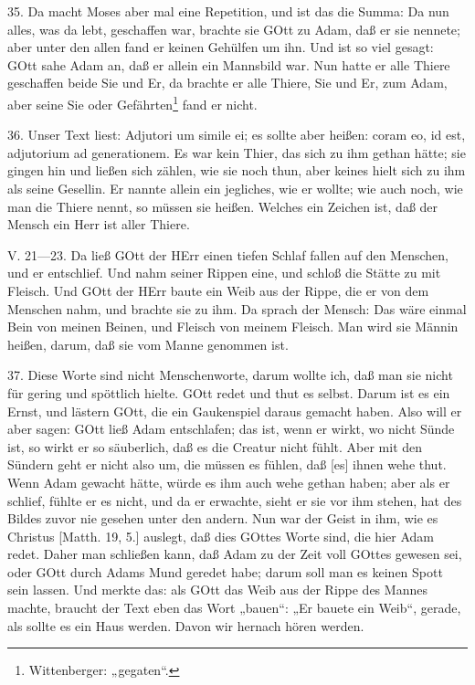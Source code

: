 35. Da macht Moses aber mal eine Repetition, und ist das die Summa: Da nun alles, was da lebt, geschaffen war, brachte sie GOtt zu Adam, daß er sie nennete; aber unter den allen fand er keinen Gehülfen um ihn. Und ist so viel gesagt: GOtt sahe Adam an, daß er allein ein Mannsbild war. Nun hatte er alle Thiere geschaffen beide Sie und Er, da brachte er alle Thiere, Sie und Er, zum Adam, aber seine Sie oder Gefährten\footnote{Wittenberger: „gegaten“.} fand er nicht.

36. Unser Text liest: Adjutori um simile ei; es sollte aber heißen: coram eo, id est, adjutorium ad generationem. Es war kein Thier, das sich zu ihm gethan hätte; sie gingen hin und ließen sich zählen, wie sie noch thun, aber
keines hielt sich zu ihm als seine Gesellin. Er nannte allein ein jegliches, wie er wollte; wie auch noch, wie man die Thiere nennt, so müssen sie heißen. Welches ein Zeichen ist, daß der Mensch ein Herr ist aller Thiere.

\begin{schriftzitat}
V. 21—23. Da ließ GOtt der HErr einen tiefen Schlaf fallen auf den Menschen, und er entschlief. Und nahm seiner Rippen eine, und schloß die Stätte zu mit Fleisch. Und GOtt der HErr baute ein Weib aus der Rippe, die er von dem Menschen nahm, und brachte sie zu ihm. Da sprach der Mensch: Das wäre einmal Bein von meinen Beinen, und Fleisch von meinem Fleisch. Man wird sie Männin heißen, darum, daß sie vom Manne genommen ist.
\end{schriftzitat}

37. Diese Worte sind nicht Menschenworte, darum wollte ich, daß man sie nicht für gering und spöttlich hielte. GOtt redet und thut es selbst. Darum ist es ein Ernst, und lästern GOtt, die ein Gaukenspiel daraus gemacht haben. Also will er aber sagen: GOtt ließ Adam entschlafen; das ist, wenn er wirkt, wo nicht Sünde ist, so wirkt er so säuberlich, daß es die Creatur nicht fühlt. Aber mit den Sündern geht er nicht also um, die müssen es fühlen, daß [es] ihnen wehe thut. Wenn Adam gewacht hätte, würde es ihm auch wehe gethan haben; aber als er schlief, fühlte er es nicht, und da er erwachte, sieht er sie vor ihm stehen, hat des Bildes zuvor nie gesehen unter den andern. Nun war der Geist in ihm, wie es Christus [Matth. 19, 5.] auslegt, daß dies GOttes Worte sind, die hier Adam redet. Daher man schließen kann, daß Adam zu der Zeit voll GOttes gewesen sei, oder GOtt durch Adams Mund geredet habe; darum soll man es keinen Spott sein lassen. Und merkte das: als GOtt das Weib aus der Rippe des Mannes machte, braucht der Text eben das Wort „bauen“: „Er bauete ein Weib“, gerade, als sollte es ein Haus werden. Davon wir hernach hören werden.

